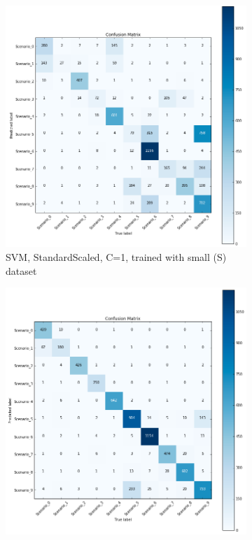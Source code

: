 \begin{figure}[!htb]
    \captionsetup[subfigure]{justification=centering}
    \centering
    \begin{subfigure}[htb]{0.49\textwidth}
        \centering
        \includegraphics[width=\linewidth]{figures/svc_scaled_S_1}
        \caption{\ac{SVM}, StandardScaled, C=1, trained with small (S) dataset}
        \label{fig:knn_2}
    \end{subfigure}
    \begin{subfigure}[htb]{0.49\textwidth}
        \centering
        \includegraphics[width=\linewidth]{figures/svc_scaled_S_1e6}

\end{subfigure}
\end{figure}
